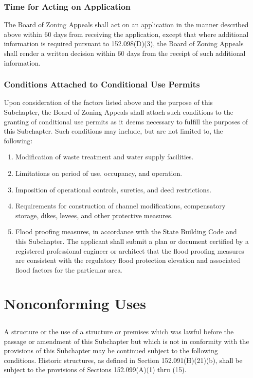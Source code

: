 \subsubsection{Time for Acting on Application}
The Board of Zoning Appeals shall act on an application in the manner described above within 60 days from receiving the application, except that where additional information is required pursuant to 152.098(D)(3), the Board of Zoning Appeals shall render a written decision within 60 days from the receipt of such additional information.
\subsubsection{Conditions Attached to Conditional Use Permits}
Upon consideration of the factors listed above and the purpose of this Subchapter, the Board of Zoning Appeals shall attach such conditions to the granting of conditional use permits as it deems necessary to fulfill the purposes of this Subchapter. Such conditions may include, but are not limited to, the following:
\begin{enumerate}[{\indent}a)]
    \item Modification of waste treatment and water supply facilities.
    \item Limitations on period of use, occupancy, and operation.
    \item Imposition of operational controls, sureties, and deed restrictions.
    \item Requirements for construction of channel modifications, compensatory storage, dikes, levees, and other protective measures.
    \item Flood proofing measures, in accordance with the State Building Code and this Subchapter. The applicant shall submit a plan or document certified by a registered professional engineer or architect that the flood proofing measures are consistent with the regulatory flood protection elevation and associated flood factors for the particular area.
\end{enumerate}
\section{Nonconforming Uses}
\subsection{}
A structure or the use of a structure or premises which was lawful before the passage or amendment of this Subchapter but which is not in conformity with the provisions of this Subchapter may be continued subject to the following conditions. Historic structures, as defined in Section 152.091(H)(21)(b), shall be subject to the provisions of Sections 152.099(A)(1) thru (15).
